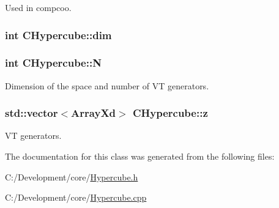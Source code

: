 Used in compcoo. 

\hypertarget{class_c_hypercube_aa46e76296cb1f00d6bbf237de95b943e}{
\subsubsection[{dim}]{\setlength{\rightskip}{0pt plus 5cm}int C\-Hypercube\-::dim\hspace{0.3cm}{\ttfamily [private]}}}\label{class_c_hypercube_aa46e76296cb1f00d6bbf237de95b943e}
\hypertarget{class_c_hypercube_a5ae7a70b21a9969219f150498c7e9cf3}{
\subsubsection[{N}]{\setlength{\rightskip}{0pt plus 5cm}int C\-Hypercube\-::\-N\hspace{0.3cm}{\ttfamily [private]}}}\label{class_c_hypercube_a5ae7a70b21a9969219f150498c7e9cf3}


Dimension of the space and number of V\-T generators. 

\hypertarget{class_c_hypercube_ae50abfa68524ad94ba198dcf08cb6389}{
\subsubsection[{z}]{\setlength{\rightskip}{0pt plus 5cm}std\-::vector$<$Array\-Xd$>$ C\-Hypercube\-::z\hspace{0.3cm}{\ttfamily [private]}}}\label{class_c_hypercube_ae50abfa68524ad94ba198dcf08cb6389}


V\-T generators. 



The documentation for this class was generated from the following files\-:\begin{DoxyCompactItemize}
\item 
C\-:/\-Development/core/\hyperlink{_hypercube_8h}{Hypercube.\-h}\item 
C\-:/\-Development/core/\hyperlink{_hypercube_8cpp}{Hypercube.\-cpp}\end{DoxyCompactItemize}
